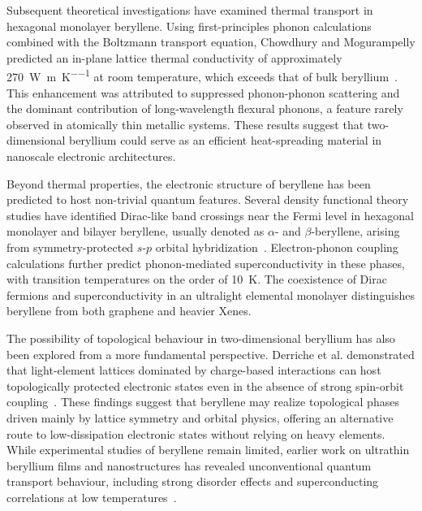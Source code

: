 Subsequent theoretical investigations have examined thermal transport in hexagonal monolayer beryllene.
Using first-principles phonon calculations combined with the Boltzmann transport equation,
Chowdhury and Mogurampelly predicted an in-plane lattice thermal conductivity of approximately \qty{270}{\watt\per\metre\per\kelvin} at room temperature,
which exceeds that of bulk beryllium~\cite{chowdhury2024unusual}.
This enhancement was attributed to suppressed phonon-phonon scattering and the dominant contribution of long-wavelength flexural phonons,
a feature rarely observed in atomically thin metallic systems.
These results suggest that two-dimensional beryllium could serve as an efficient heat-spreading material in nanoscale electronic architectures.

Beyond thermal properties,
the electronic structure of beryllene has been predicted to host non-trivial quantum features.
Several density functional theory studies have identified Dirac-like band crossings near the Fermi level in hexagonal monolayer and bilayer beryllene,
usually denoted as $\alpha$- and $\beta$-beryllene,
arising from symmetry-protected $s$-$p$ orbital hybridization~\cite{li2023coexistence}.
Electron-phonon coupling calculations further predict phonon-mediated superconductivity in these phases,
with transition temperatures on the order of \qty{10}{\kelvin}.
The coexistence of Dirac fermions and superconductivity in an ultralight elemental monolayer distinguishes beryllene from both graphene and heavier Xenes.

The possibility of topological behaviour in two-dimensional beryllium has also been explored from a more fundamental perspective.
Derriche et al. demonstrated that light-element lattices dominated by charge-based interactions can host topologically protected electronic states even in the absence of strong spin-orbit coupling~\cite{derriche2024light}.
These findings suggest that beryllene may realize topological phases driven mainly by lattice symmetry and orbital physics,
offering an alternative route to low-dissipation electronic states without relying on heavy elements.
While experimental studies of beryllene remain limited,
earlier work on ultrathin beryllium films and nanostructures has revealed unconventional quantum transport behaviour,
including strong disorder effects and superconducting correlations at low temperatures~\cite{xiong2009spin}.

